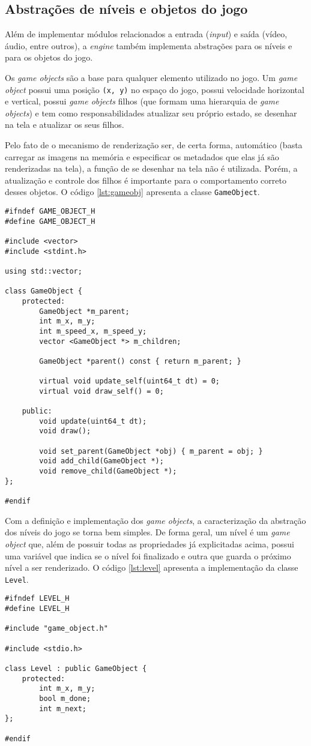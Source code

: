 \subsection{Abstrações de níveis e objetos do jogo}

Além de implementar módulos relacionados a entrada (\textit{input}) e saída (vídeo, áudio, entre outros), a \textit{engine} também implementa abstrações para os níveis e para os objetos do jogo.

Os \textit{game objects} são a base para qualquer elemento utilizado no jogo. Um \textit{game object} possui uma posição \texttt{(x, y)} no espaço do jogo, possui velocidade horizontal e vertical, possui \textit{game objects} filhos (que formam uma hierarquia de \textit{game objects}) e tem como responsabilidades atualizar seu próprio estado, se desenhar na tela e atualizar os seus filhos.

Pelo fato de o mecanismo de renderização ser, de certa forma, automático (basta carregar as imagens na memória e especificar os metadados que elas já são renderizadas na tela), a função de se desenhar na tela não é utilizada. Porém, a atualização e controle dos filhos é importante para o comportamento correto desses objetos. O código \ref{lst:gameobj} apresenta a classe \texttt{GameObject}.

\begin{lstlisting}[label={lst:gameobj},caption={Classe \texttt{GameObject}}]
#ifndef GAME_OBJECT_H
#define GAME_OBJECT_H

#include <vector>
#include <stdint.h>

using std::vector;

class GameObject {
    protected:
        GameObject *m_parent;
        int m_x, m_y;
        int m_speed_x, m_speed_y;
        vector <GameObject *> m_children;

        GameObject *parent() const { return m_parent; }

        virtual void update_self(uint64_t dt) = 0;
        virtual void draw_self() = 0;

    public:
        void update(uint64_t dt);
        void draw();

        void set_parent(GameObject *obj) { m_parent = obj; }
        void add_child(GameObject *);
        void remove_child(GameObject *);
};

#endif
\end{lstlisting}

Com a definição e implementação dos \textit{game objects}, a caracterização da abstração dos níveis do jogo se torna bem simples. De forma geral, um nível é um \textit{game object} que, além de possuir todas as propriedades já explicitadas acima, possui uma variável que indica se o nível foi finalizado e outra que guarda o próximo nível a ser renderizado. O código \ref{lst:level} apresenta a implementação da classe \texttt{Level}.

\begin{lstlisting}[label={lst:level},caption={Classe \texttt{Level}}]
#ifndef LEVEL_H
#define LEVEL_H

#include "game_object.h"

#include <stdio.h>

class Level : public GameObject {
    protected:
        int m_x, m_y;
        bool m_done;
        int m_next;
};

#endif
\end{lstlisting}